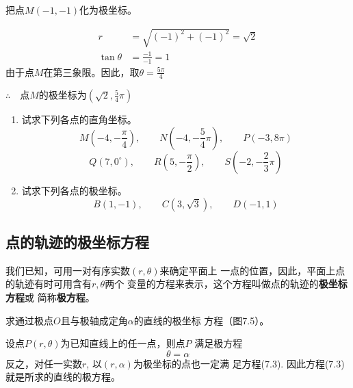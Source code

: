 \begin{example}
    把点$M(-1,-1)$化为极坐标。
\end{example}

\begin{solution}
\[\begin{split}
    r&=\sqrt{(-1)^2+(-1)^2}=\sqrt{2}\\
    \tan\theta&=\frac{-1}{-1}=1
\end{split}\]
由于点$M$在第三象限。因此，取$\theta=\frac{5\pi}{4}$

$\therefore\quad $点$M$的极坐标为$\left(\sqrt{2},\frac{5}{4}\pi\right)$
\end{solution}

\begin{ex}
\begin{enumerate}
    \item 试求下列各点的直角坐标。
\[M\left(-4,-\frac{\pi}{4}\right),\qquad N\left(-4,-\frac{5}{4}\pi\right),\qquad P(-3,8\pi)\]
\[Q(7,0^{\circ}),\qquad R\left(5,-\frac{\pi}{2}\right),\qquad S\left(-2,-\frac{2}{3}\pi\right)\]
    \item 试求下列各点的极坐标。
\[B(1,-1),\qquad C\left(3,\sqrt{3}\right),\qquad D(-1,1)\]
\end{enumerate}
\end{ex}

\subsection{点的轨迹的极坐标方程}
我们已知，可用一对有序实数$(r,\theta)$来确定平面上
一点的位置，因此，平面上点的轨迹有时可用含有$r,\theta$两个
变量的方程来表示，这个方程叫做点的轨迹的\textbf{极坐标方程}或
简称\textbf{极方程}。


\begin{example}
    求通过极点$O$且与极轴成定角$\alpha$的直线的极坐标
    方程（图7.5）。
\end{example}

\begin{solution}
    设点$P(r,\theta)$为已知直线上的任一点，则点$P$
    满足极方程
 \begin{equation}
     \theta=\alpha
 \end{equation}
    反之，对任一实数$r$, 以$(r,\alpha)$为极坐标的点也一定满
    足方程(7.3). 因此方程(7.3)就是所求的直线的极方程。
\end{solution}


